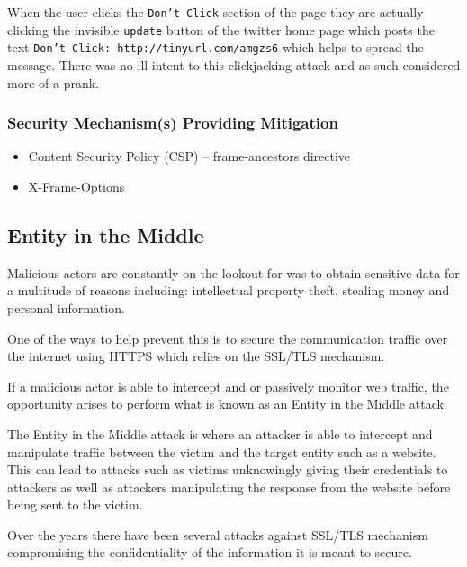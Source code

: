 \documentclass{mscreport}
\begin{document}
\vspace{0.3cm} \noindent
When the user clicks the \texttt{Don't Click} section of the page they are actually clicking the invisible \texttt{update} button of the twitter home page which posts the text \texttt{Don’t Click: http://tinyurl.com/amgzs6} \cite{Jani2015-kw} which helps to spread the message. There was no ill intent to this clickjacking attack and as such considered more of a prank.
\subsubsection{Security Mechanism(s) Providing Mitigation}

\begin{itemize}
	\setlength\itemsep{0.1em}
	\item Content Security Policy (CSP) – frame-ancestors directive
	\item X-Frame-Options
\end{itemize}

\subsection{Entity in the Middle}
\label{subsection:entity_in_the_middle}

Malicious actors are constantly on the lookout for was to obtain sensitive data for a multitude of reasons including: intellectual property theft, stealing money and personal information.

\vspace{0.3cm} \noindent
One of the ways to help prevent this is to secure the communication traffic over the internet using HTTPS which relies on the SSL/TLS mechanism.

\vspace{0.3cm} \noindent
If a malicious actor is able to intercept and or passively monitor web traffic, the opportunity arises to perform what is known as an Entity in the Middle attack.

\vspace{0.3cm} \noindent
The Entity in the Middle attack is where an attacker is able to intercept and manipulate traffic between the victim and the target entity such as a website. This can lead to attacks such as victims unknowingly giving their credentials to attackers as well as attackers manipulating the response from the website before being sent to the victim.

\vspace{0.3cm} \noindent
Over the years there have been several attacks against SSL/TLS mechanism compromising the confidentiality of the information it is meant to secure.
\end{document}
